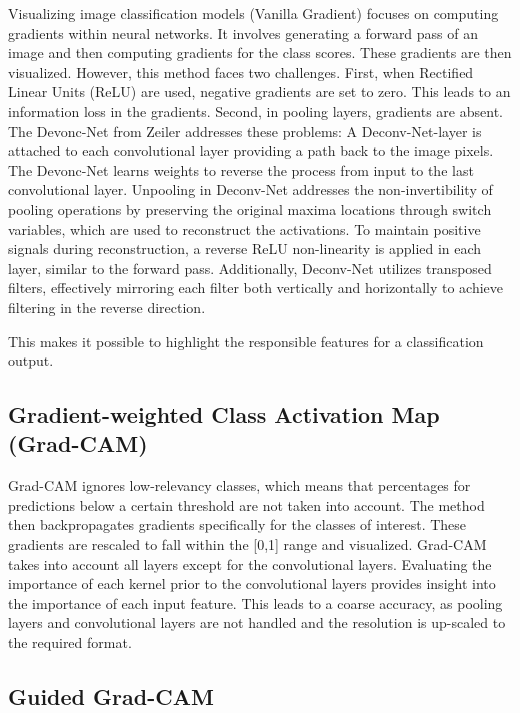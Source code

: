 Visualizing image classification models (Vanilla Gradient) \cite{simonyan2014deep} focuses on computing gradients within neural networks. It involves generating a forward pass of an image and then computing gradients for the class scores. These gradients are then visualized. However, this method faces two challenges. First, when Rectified Linear Units (ReLU) are used, negative gradients are set to zero. This leads to an information loss in the gradients. Second, in pooling layers, gradients are absent.
\\
The Devonc-Net from Zeiler \cite{zeiler2013visualizing} addresses these problems:
A Deconv-Net-layer \cite{Zeiler2011AdaptiveDN} is attached to each convolutional layer providing a path back to the image pixels. The Devonc-Net learns weights to reverse the process from input to the last convolutional layer. Unpooling in Deconv-Net addresses the non-invertibility of pooling operations by preserving the original maxima locations through switch variables, which are used to reconstruct the activations. To maintain positive signals during reconstruction, a reverse ReLU non-linearity is applied in each layer, similar to the forward pass. Additionally, Deconv-Net utilizes transposed filters, effectively mirroring each filter both vertically and horizontally to achieve filtering in the reverse direction.

This makes it possible to highlight the responsible features for a classification output.

\subsection{Gradient-weighted Class Activation Map (Grad-CAM)}

Grad-CAM \cite{springenberg2015striving} ignores low-relevancy classes, which means that percentages for predictions below a certain threshold are not taken into account. The method then backpropagates gradients specifically for the classes of interest. These gradients are rescaled to fall within the [0,1] range and visualized. Grad-CAM takes into account all layers except for the convolutional layers. Evaluating the importance of each kernel prior to the convolutional layers provides insight into the importance of each input feature. This leads to a coarse accuracy, as pooling layers and convolutional layers are not handled and the resolution is up-scaled to the required format.

\subsection{Guided Grad-CAM}

